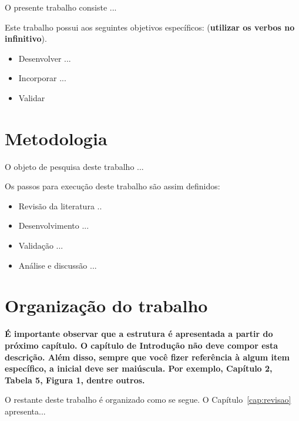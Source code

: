 O presente trabalho consiste ...

Este trabalho possui aos seguintes objetivos específicos: (\textbf{utilizar os verbos no infinitivo}).

\begin{itemize}
	\item Desenvolver ...
	\item Incorporar ...
	\item Validar
\end{itemize}

\section{Metodologia}
\label{sec:metodologia}

O objeto de pesquisa deste trabalho ...

Os passos para execução deste trabalho são assim definidos:

\begin{itemize}
	\item Revisão da literatura ..
	\item Desenvolvimento ...
	\item Validação ...
	\item Análise e discussão ...
\end{itemize}

\section{Organização do trabalho}

\textbf{É importante observar que a estrutura é apresentada a partir do próximo capítulo. O capítulo de Introdução não deve compor esta descrição. Além disso, sempre que você fizer referência à algum item específico, a inicial deve ser maiúscula. Por exemplo, Capítulo 2, Tabela 5, Figura 1, dentre outros.}

O restante deste trabalho é organizado como se segue. O Capítulo~\ref{cap:revisao} apresenta...
